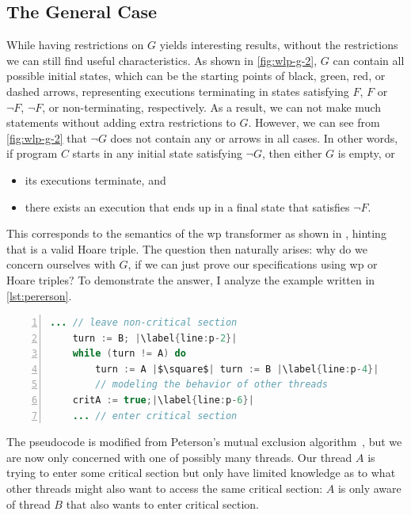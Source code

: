 \subsection{The General Case}
While having restrictions on $G$ yields interesting results, without the restrictions we can still find useful characteristics. 
As shown in \autoref{fig:wlp-g-2}, $G$ can contain all possible initial states, which can be the starting points of black, green, red, or dashed arrows, representing executions terminating in states satisfying $F$, $F$ or $\neg F$, $\neg F$, or non-terminating, respectively. 
As a result, we can not make much statements without adding extra restrictions to $G$. 
However, we can see from \autoref{fig:wlp-g-2} that $\neg G$ does not contain any  or  arrows in all cases. 
In other words, if program $C$ starts in any initial state satisfying $\neg G$, then either $G$ is empty, or
\begin{itemize}
	\item its executions terminate, and
	\item there exists an execution that ends up in a final state that satisfies $\neg F$. 
\end{itemize}

This corresponds to the semantics of the wp transformer as shown in , hinting that  is a valid Hoare triple. 
The question then naturally arises: why do we concern ourselves with $G$, if we can just prove our specifications using wp or Hoare triples? 
To demonstrate the answer, I analyze the example written in \autoref{lst:pererson}. 

\begin{lstlisting}[caption={Thread $A$ Hoping to Access Critical Section}, label={lst:pererson}, language=java, numbers=left, stepnumber=1, captionpos=b,escapechar=|,frame=single]
	... // leave non-critical section
	turn := B; |\label{line:p-2}|
	while (turn != A) do 
		turn := A |$\square$| turn := B |\label{line:p-4}|
		// modeling the behavior of other threads
	critA := true;|\label{line:p-6}|
	... // enter critical section  
\end{lstlisting}

The pseudocode is modified from Peterson's mutual exclusion algorithm~\cite{peterson1981}, but we are now only concerned with one of possibly many threads.
Our thread $A$ is trying to enter some critical section but only have limited knowledge as to what other threads might also want to access the same critical section: $A$ is only aware of thread $B$ that also wants to enter critical section. 

